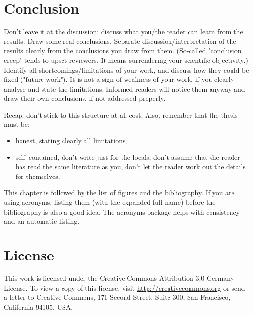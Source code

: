 \documentclass[a4paper,oneside, openright,12pt]{report}
\begin{document}
\chapter{Conclusion}

Don't leave it at the discussion: discuss what you/the reader can learn from the results. Draw some real conclusions. Separate discussion/interpretation of the results clearly from the conclusions you draw from them. (So-called "conclusion creep" tends to upset reviewers. It means surrendering your scientific objectivity.) Identify all shortcomings/limitations of your work, and discuss how they could be fixed ("future work"). It is not a sign of weakness of your work, if you clearly analyse and state the limitations. Informed readers will notice them anyway and draw their own conclusions, if not addressed properly.

\vspace{\baselineskip}
Recap: don't stick to this structure at all cost. Also, remember that the thesis must be:

\begin{itemize}
	\item honest, stating clearly all limitations;
	\item self--contained, don't write just for the locals, don't assume that the reader has read the same literature as you, don't let the reader work out the details for themselves.
\end{itemize}



This chapter is followed by the list of figures and the bibliography. If you are using acronyms, listing them (with the expanded full name) before the bibliography is also a good idea. The acronyms package helps with consistency and an automatic listing.




\cleardoublepage
{}
\listoffigures 	 %


\cleardoublepage
{}





\cleardoublepage
\chapter*{License}
This work is licensed under the Creative Commons Attribution 3.0 Germany
License. To view a copy of this license,
visit \href{http://creativecommons.org/licenses/by/3.0/de/}{http://creativecommons.org} or send a letter
to Creative Commons, 171 Second Street, Suite 300, San
Francisco, California 94105, USA.
\end{document}
